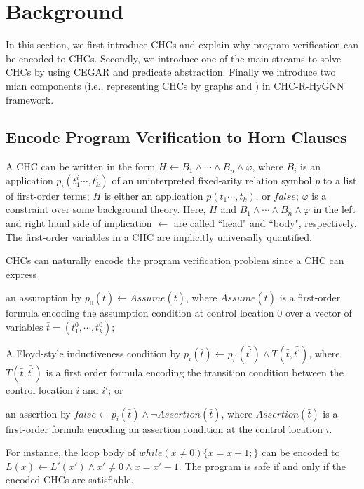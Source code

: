 

\section{Background}\label{section:background}
In this section, we first introduce CHCs and explain why program verification can be encoded to CHCs.
%
Secondly, we introduce one of the main streams to solve CHCs by using CEGAR and predicate abstraction.
%
Finally we introduce two mian components (i.e., representing CHCs by graphs and \hyperedgeGNN) in CHC-R-HyGNN framework.


\subsection{Encode Program Verification to Horn Clauses}
A CHC can be written in the form
$H \leftarrow B_{1}  \wedge \cdots \wedge B_{n} \wedge \varphi$,
where $B_{i}$ is an application $p_{i}(t_{1}^{i} \cdots, t_{k}^{i})$ of an uninterpreted fixed-arity relation symbol $p$ to a list of first-order terms;
 $H$ is either an application $p(t_{1} \cdots, t_{k})$, or $\mathit{false}$;
 $\varphi$ is a constraint over some background theory.
Here, $H$ and $B_{1} \wedge \cdots \wedge B_{n} \wedge \varphi$ in the left and right hand side of implication $\leftarrow$ are called ``head" and ``body", respectively.
%
The first-order variables in a CHC are implicitly universally quantified.


CHCs can naturally encode the program verification problem since a CHC can express 
\begin{inparaenum}[(i)]
  \item an assumption by $p_{0}(\bar{t})\leftarrow Assume(\bar{t})$, where $Assume(\bar{t})$ is a first-order formula encoding the assumption condition at control location $0$ over a vector of variables $\bar{t}=(t_{1}^{0},\cdots,t_{k}^{0})$;
  \item A Floyd-style inductiveness condition by $p_{i}(\bar{t}) \leftarrow p_{i^{'}}(\bar{t^{'}}) \wedge T(\bar{t},\bar{t^{'}})$, where $T(\bar{t},\bar{t^{'}})$ is a first order formula encoding the transition condition between the control location $i$ and $i'$; or
  \item an assertion by $\textit{false}\leftarrow p_{i}(\bar{t}) \wedge \neg Assertion(\bar{t})$,  where $Assertion(\bar{t})$ is a first-order formula encoding an assertion condition at the control location $i$.
\end{inparaenum}
For instance, the loop body of $while(x\neq 0)\{x=x+1;\}$ can be encoded to $L(x)\leftarrow L'(x') \wedge x'\neq 0 \wedge x=x'-1 $.
%
The program is safe if and only if the encoded CHCs are satisfiable.


